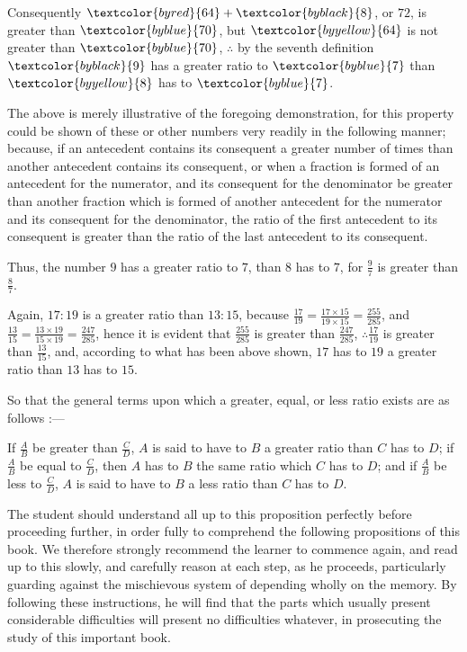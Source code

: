 \documentclass[booklanguage=english]{byrnebook}
\begin{document}
Consequently $\textcolor{byred}{64} + \textcolor{byblack}{8}$, or $72$, is greater than $\textcolor{byblue}{70}$, but $\textcolor{byyellow}{64}$ is not greater than $\textcolor{byblue}{70}$, $\therefore$ by the seventh definition $\textcolor{byblack}{9}$ has a greater ratio to $\textcolor{byblue}{7}$ than $\textcolor{byyellow}{8}$ has to $\textcolor{byblue}{7}$.

The above is merely illustrative of the foregoing demonstration, for this property could be shown of these or other numbers very readily in the following manner; because, if an antecedent contains its consequent a greater number of times than another antecedent contains its consequent, or when a fraction is formed of an antecedent for the numerator, and its consequent for the denominator be greater than another fraction which is formed of another antecedent for the numerator and its consequent for the denominator, the ratio of the first antecedent to its consequent is greater than the ratio of the last antecedent to its consequent.

Thus, the number $9$ has a greater ratio to $7$, than $8$ has to $7$, for $\frac{9}{7}$ is greater than $\frac{8}{7}$.

Again, $17 : 19$ is a greater ratio than $13 : 15$, because $\frac{17}{19} = \frac{17 \times 15}{19 \times 15} = \frac{255}{285}$, and $\frac{13}{15} = \frac{13 \times 19}{15 \times 19} = \frac{247}{285}$, hence it is evident that $\frac{255}{285}$ is greater than $\frac{247}{285}$, $\therefore \frac{17}{19}$ is greater than $\frac{13}{15}$, and, according to what has been above shown, $17$ has to $19$ a greater ratio than $13$ has to $15$.

So that the general terms upon which a greater, equal, or less ratio exists are as follows :—

If $\frac{A}{B}$ be greater than $\frac{C}{D}$, $A$ is said to have to $B$ a greater ratio than $C$ has to $D$; if $\frac{A}{B}$ be equal to $\frac{C}{D}$, then $A$ has to $B$ the same ratio which $C$ has to $D$; and if $\frac{A}{B}$ be less to $\frac{C}{D}$, $A$ is said to have to $B$ a less ratio than $C$ has to $D$.

The student should understand all up to this proposition perfectly before proceeding further, in order fully to comprehend the following propositions of this book. We therefore strongly recommend the learner to commence again, and read up to this slowly, and carefully reason at each step, as he proceeds, particularly guarding against the mischievous system of depending wholly on the memory. By following these instructions, he will find that the parts which usually present considerable difficulties will present no difficulties whatever, in prosecuting the study of this important book.
\end{document}
